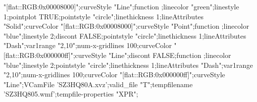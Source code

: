 \documentclass{article}
\begin{document}
{{"[flat::RGB:0x00008000]";curveStyle "Line";function
;linecolor "green";linestyle 1;pointplot
TRUE;pointstyle "circle";linethickness 1;lineAttributes "Solid";curveColor
"[flat::RGB:0x00008000]";curveStyle "Point";function ;linecolor
"blue";linestyle 2;discont FALSE;pointstyle "circle";linethickness
1;lineAttributes "Dash";var1range "2,10";num-x-gridlines 100;curveColor
"[flat::RGB:0x000000ff]";curveStyle "Line";discont FALSE;function
;linecolor "blue";linestyle 2;pointstyle "circle";linethickness
1;lineAttributes "Dash";var1range "2,10";num-x-gridlines 100;curveColor
"[flat::RGB:0x000000ff]";curveStyle "Line";VCamFile
'SZ3HQ80A.xvz';valid_file "T";tempfilename
'SZ3HQ805.wmf';tempfile-properties "XPR";}}
\end{document}
